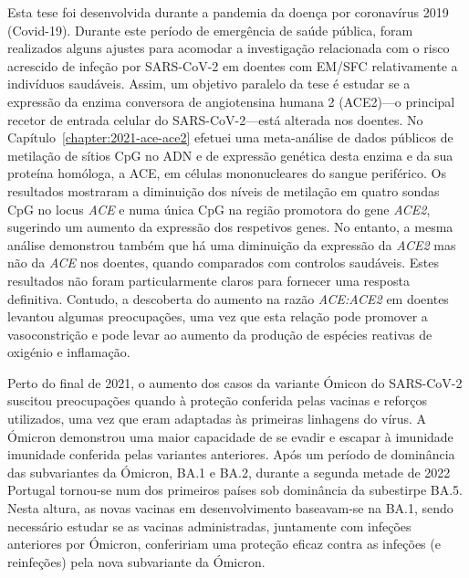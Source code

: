 Esta tese foi desenvolvida durante a pandemia da doença por coronavírus 2019 (Covid-19). Durante este período de emergência de saúde pública, foram realizados alguns ajustes para acomodar a investigação relacionada com o risco acrescido de infeção por SARS-CoV-2 em doentes com EM/SFC relativamente a indivíduos saudáveis. Assim, um objetivo paralelo da tese é estudar se a expressão da enzima conversora de angiotensina humana 2 (ACE2)---o principal recetor de entrada celular do SARS-CoV-2---está alterada nos doentes. No Capítulo~\ref{chapter:2021-ace-ace2} efetuei uma meta-análise de dados públicos de metilação de sítios CpG no ADN e de expressão genética desta enzima e da sua proteína homóloga, a ACE, em células mononucleares do sangue periférico. Os resultados mostraram a diminuição dos níveis de metilação em quatro sondas CpG no locus \textit{ACE} e numa única CpG na região promotora do gene \textit{ACE2}, sugerindo um aumento da expressão dos respetivos genes. No entanto, a mesma análise demonstrou também que há uma diminuição da expressão da \textit{ACE2} mas não da \textit{ACE} nos doentes, quando comparados com controlos saudáveis. Estes resultados não foram particularmente claros para fornecer uma resposta definitiva. Contudo, a descoberta do aumento na razão \textit{ACE:ACE2} em doentes levantou algumas preocupações, uma vez que esta relação pode promover a vasoconstrição e pode levar ao aumento da produção de espécies reativas de oxigénio e inflamação.

\bsni
Perto do final de 2021, o aumento dos casos da variante Ómicon do SARS-CoV-2 suscitou preocupações quando à proteção conferida pelas vacinas e reforços utilizados, uma vez que eram adaptadas às primeiras linhagens do vírus.
A Ómicron demonstrou uma maior capacidade de se evadir e escapar à imunidade imunidade conferida pelas variantes anteriores. Após um período de dominância das subvariantes da Ómicron, BA.1 e BA.2, durante a segunda metade de 2022 Portugal tornou-se num dos primeiros países sob dominância da subestirpe BA.5. Nesta altura, as novas vacinas em desenvolvimento baseavam-se na BA.1, sendo necessário estudar se as vacinas administradas, juntamente com infeções anteriores por Ómicron, confeririam uma proteção eficaz contra as infeções (e reinfeções) pela nova subvariante da Ómicron.

